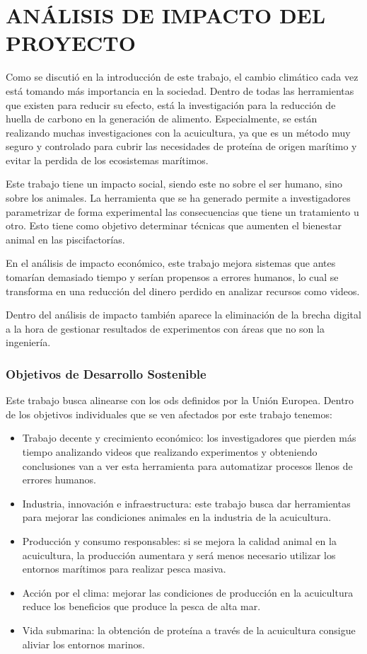 \section{ANÁLISIS DE IMPACTO DEL PROYECTO}

Como se discutió en la introducción de este trabajo, el cambio climático cada vez está tomando más importancia en la sociedad. Dentro de todas las herramientas que existen para reducir su 
efecto, está la investigación para la reducción de huella de carbono en la generación de alimento. Especialmente, se están realizando muchas investigaciones con la acuicultura, ya que es un 
método muy seguro y controlado para cubrir las necesidades de proteína de origen marítimo y evitar la perdida de los ecosistemas marítimos.

Este trabajo tiene un impacto social, siendo este no sobre el ser humano, sino sobre los animales. La herramienta que se ha generado permite a investigadores parametrizar de forma experimental 
las consecuencias que tiene un tratamiento u otro. Esto tiene como objetivo determinar técnicas que aumenten el bienestar animal en las piscifactorías.

En el análisis de impacto económico, este trabajo mejora sistemas que antes tomarían demasiado tiempo y serían propensos a errores humanos, lo cual se transforma en una reducción del dinero 
perdido en analizar recursos como videos.

Dentro del análisis de impacto también aparece la eliminación de la brecha digital a la hora de gestionar resultados de experimentos con áreas que no son la ingeniería.

\subsubsection*{Objetivos de Desarrollo Sostenible}

Este trabajo busca alinearse con los \acrshort{ods} definidos por la Unión Europea. Dentro de los objetivos individuales que se ven afectados por este trabajo tenemos:
\begin{itemize}
    \item Trabajo decente y crecimiento económico: los investigadores que pierden más tiempo analizando videos que realizando experimentos y obteniendo conclusiones van a ver esta herramienta 
    para automatizar procesos llenos de errores humanos.
    \item Industria, innovación e infraestructura: este trabajo busca dar herramientas para mejorar las condiciones animales en la industria de la acuicultura.
    \item Producción y consumo responsables: si se mejora la calidad animal en la acuicultura, la producción aumentara y será menos necesario utilizar los entornos marítimos para realizar pesca 
    masiva.
    \item Acción por el clima: mejorar las condiciones de producción en la acuicultura reduce los beneficios que produce la pesca de alta mar.
    \item Vida submarina: la obtención de proteína a través de la acuicultura consigue aliviar los entornos marinos.
\end{itemize}